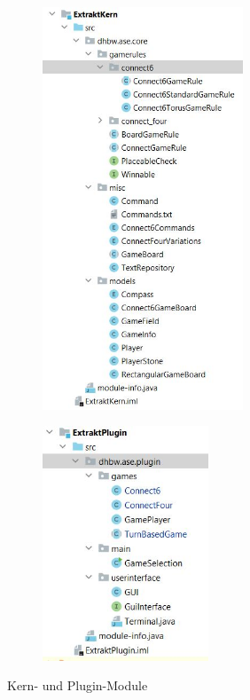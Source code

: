 \documentclass[12pt]{article}
\begin{document}
\begin{figure}[htpb!]
\centering
\begin{subfigure}{.5\textwidth}
  \centering
  \includegraphics[height=12cm]{Bilder/KernModul_Packages}\\[2cm]
  \label{fig:sub1}
\end{subfigure}%
\begin{subfigure}{.5\textwidth}
  \centering
  \includegraphics[height=7cm]{Bilder/PluginModul_Packages}\\[2cm]
  \label{fig:sub2}
\end{subfigure}
\caption{Kern- und Plugin-Module}
\label{fig:test}
\end{figure}
\end{document}
